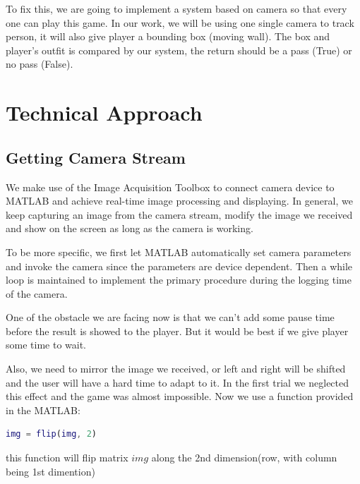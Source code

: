 \documentclass[conference,compsoc]{IEEEtran}
\begin{document}
	\par
		To fix this, we are going to implement a system based on camera so that every one can play this game.
		In our work, we will be using one single camera to track person, it will also give player a bounding box (moving wall).
		The box and player's outfit is compared by our system, the return should be a pass (True) or no pass (False).
\section{Technical Approach}
	\subsection{Getting Camera Stream}
	\par
	We make use of the Image Acquisition Toolbox to connect camera device to MATLAB and achieve real-time image processing and displaying. In general, we keep capturing an image from the camera stream, modify the image we received and show on the screen as long as the camera is working.
	\par
	To be more specific, we first let MATLAB automatically set camera parameters and invoke the camera since the parameters are device dependent. Then a while loop is maintained to implement the primary procedure during the logging time of the camera.
	\par
	One of the obstacle we are facing now is that we can't add some pause time before the result is showed to the player. But it would be best if we give player some time to wait.
	\par
	Also, we need to mirror the image we received, or left and right will be shifted and the user will have a hard time to adapt to it.
	In the first trial we neglected this effect and the game was almost impossible. Now we use a function provided in the MATLAB:
	\begin{lstlisting}[language = MATLAB]
		img = flip(img, 2)\end{lstlisting}
	this function will flip matrix $img$ along the 2nd dimension(row, with column being 1st dimention)
\end{document}
